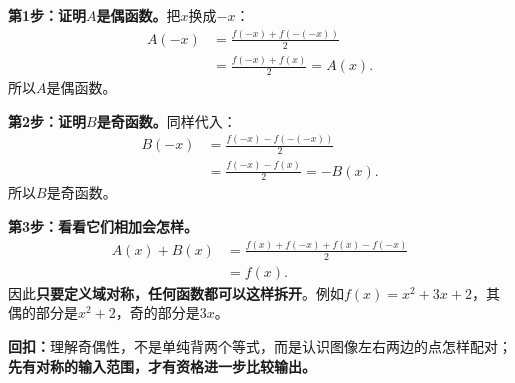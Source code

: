 \clearpage
\begin{proofbox}
\textbf{第1步：证明$A$是偶函数。}把$x$换成$-x$：
\[
\begin{aligned}
A(-x)&=\frac{f(-x)+f(-(-x))}2\\
&=\frac{f(-x)+f(x)}2=A(x).
\end{aligned}
\]
所以$A$是偶函数。

\textbf{第2步：证明$B$是奇函数。}同样代入：
\[
\begin{aligned}
B(-x)&=\frac{f(-x)-f(-(-x))}2\\
&=\frac{f(-x)-f(x)}2=-B(x).
\end{aligned}
\]
所以$B$是奇函数。

\textbf{第3步：看看它们相加会怎样。}
\[
\begin{aligned}
A(x)+B(x)
&=\frac{f(x)+f(-x)+f(x)-f(-x)}2\\
&=f(x).
\end{aligned}
\]
因此\textbf{只要定义域对称，任何函数都可以这样拆开}。例如$f(x)=x^2+3x+2$，其偶的部分是$x^2+2$，奇的部分是$3x$。

\medskip
\textbf{回扣：}理解奇偶性，不是单纯背两个等式，而是认识图像左右两边的点怎样配对；\textbf{先有对称的输入范围，才有资格进一步比较输出。}
\end{proofbox}
